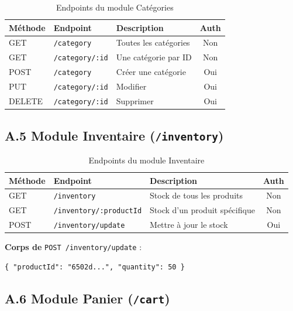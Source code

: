 \begin{table}[H]
    \centering
    \begin{tabular}{|l|l|p{5.5cm}|c|}
        \hline
        \textbf{Méthode} & \textbf{Endpoint} & \textbf{Description} & \textbf{Auth} \\
        \hline
        GET    & \texttt{/category}     & Toutes les catégories & Non \\
        GET    & \texttt{/category/:id} & Une catégorie par ID  & Non \\
        POST   & \texttt{/category}     & Créer une catégorie   & Oui \\
        PUT    & \texttt{/category/:id} & Modifier              & Oui \\
        DELETE & \texttt{/category/:id} & Supprimer             & Oui \\
        \hline
    \end{tabular}
    \caption{Endpoints du module Catégories}
\end{table}

\subsection*{A.5 Module Inventaire (\texttt{/inventory})}

\begin{table}[H]
    \centering
    \begin{tabular}{|l|l|p{5.5cm}|c|}
        \hline
        \textbf{Méthode} & \textbf{Endpoint} & \textbf{Description} & \textbf{Auth} \\
        \hline
        GET  & \texttt{/inventory}            & Stock de tous les produits   & Non \\
        GET  & \texttt{/inventory/:productId} & Stock d'un produit spécifique & Non \\
        POST & \texttt{/inventory/update}     & Mettre à jour le stock       & Oui \\
        \hline
    \end{tabular}
    \caption{Endpoints du module Inventaire}
\end{table}

\textbf{Corps de} \texttt{POST /inventory/update} :
\begin{verbatim}
{ "productId": "6502d...", "quantity": 50 }
\end{verbatim}

\subsection*{A.6 Module Panier (\texttt{/cart})}

